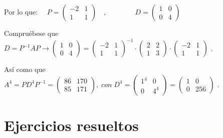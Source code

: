 \begin{ejem}
Por lo que: $\quad P=\left( \begin{matrix} -2&1\\1&1 \end{matrix} \right) \quad , \qquad \qquad 
D=\left( \begin{matrix} 1&0\\0&4 \end{matrix} \right) $

\noindent \footnotesize{\textcolor{gris}{Compruébese que $D=P^{-1}AP \to  \left( \begin{matrix} 1&0\\0&4 \end{matrix} \right)=\left( \begin{matrix} -2&1\\1&1 \end{matrix} \right)^{-1} \cdot 
\left( \begin{matrix} 2&2\\1&3 \end{matrix} \right) \cdot 
\left( \begin{matrix} -2&1\\1&1 \end{matrix} \right)$ }}\normalsize{.}

\noindent \footnotesize{\textcolor{gris}{Así como que $A^4=PD^4P^{-1}=\left( \begin{matrix} 86&170\\85&171 \end{matrix} \right), \; con \; D^4=\left( \begin{matrix} 1^4&0\\0&4^4 \end{matrix} \right)=\left( \begin{matrix} 1&0\\0&256 \end{matrix} \right)$  }}\normalsize{.}


\end{ejem}







\section{Ejercicios resueltos}

